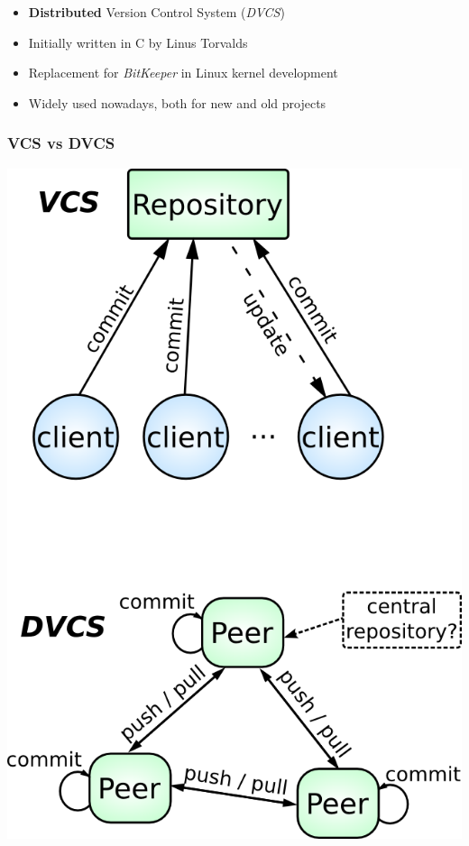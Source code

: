 
\begin{frame}
  \frametitle{\insertsubsection}

  \begin{itemize}
    \item \textbf{Distributed} Version Control System (\textit{DVCS}) \vspacing
    \item Initially written in C by Linus Torvalds\vspacing
    \item Replacement for \textit{BitKeeper} in Linux kernel development \vspacing
    \item Widely used nowadays, both for new and old projects
  \end{itemize}
\end{frame}


\subsubsection{VCS vs DVCS}

\begin{frame}[plain]

  \begin{center}
    \includegraphics[height=1.0\textheight]{images/vcs-vs-dvcs.png}
  \end{center}
\end{frame}

